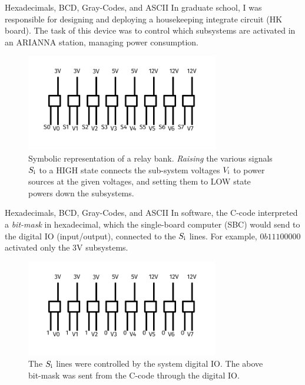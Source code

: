 \documentclass{beamer}
\begin{document}
\begin{frame}{Hexadecimals, BCD, Gray-Codes, and ASCII}
\small In graduate school, I was responsible for designing and deploying a housekeeping integrate circuit (HK board).  The task of this device was to control which subsystems are activated in an ARIANNA station, managing power consumption.
\begin{figure}
\centering
\includegraphics[width=0.75\textwidth,trim=0cm 1cm 0cm 0.5cm,clip=true]{figures/RelayBank.pdf}
\caption{\label{fig:relay} \small Symbolic representation of a relay bank. \textit{Raising} the various signals $S_{\rm i}$ to a HIGH state connects the sub-system voltages $V_{\rm i}$ to power sources at the given voltages, and setting them to LOW state powers down the subsystems.}
\end{figure}
\end{frame}

\begin{frame}{Hexadecimals, BCD, Gray-Codes, and ASCII}
\small In software, the C-code interpreted a \textit{\alert{bit-mask}} in hexadecimal, which the single-board computer (SBC) would send to the digital IO (input/output), connected to the $S_{\rm i}$ lines.  For example, $0b11100000$ activated only the 3V subsystems.
\begin{figure}
\centering
\includegraphics[width=0.75\textwidth,trim=0cm 1cm 0cm 0.5cm,clip=true]{figures/RelayBank2.pdf}
\caption{\label{fig:relay2} \small The $S_{\rm i}$ lines were controlled by the system digital IO.  The above bit-mask was sent from the C-code through the digital IO.}
\end{figure}
\end{frame}
\end{document}
